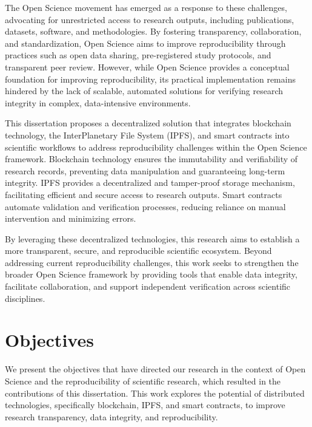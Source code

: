 \documentclass[final]{rc-book-2.14}
\begin{document}
The Open Science movement has emerged as a response to these challenges, advocating for unrestricted access to research outputs, including publications, datasets, software, and methodologies. By fostering transparency, collaboration, and standardization, Open Science aims to improve reproducibility through practices such as open data sharing, pre-registered study protocols, and transparent peer review. However, while Open Science provides a conceptual foundation for improving reproducibility, its practical implementation remains hindered by the lack of scalable, automated solutions for verifying research integrity in complex, data-intensive environments.

This dissertation proposes a decentralized solution that integrates blockchain technology, the InterPlanetary File System (IPFS), and smart contracts into scientific workflows to address reproducibility challenges within the Open Science framework. Blockchain technology ensures the immutability and verifiability of research records, preventing data manipulation and guaranteeing long-term integrity. IPFS provides a decentralized and tamper-proof storage mechanism, facilitating efficient and secure access to research outputs. Smart contracts automate validation and verification processes, reducing reliance on manual intervention and minimizing errors.

By leveraging these decentralized technologies, this research aims to establish a more transparent, secure, and reproducible scientific ecosystem. Beyond addressing current reproducibility challenges, this work seeks to strengthen the broader Open Science framework by providing tools that enable data integrity, facilitate collaboration, and support independent verification across scientific disciplines.


\section{Objectives}
\label{chp:intro:sec:objectives}

We present the objectives that have directed our research in the context of Open Science and the reproducibility of scientific research, which resulted in the contributions of this dissertation. This work explores the potential of distributed technologies, specifically blockchain, IPFS, and smart contracts, to improve research transparency, data integrity, and reproducibility.
\end{document}
